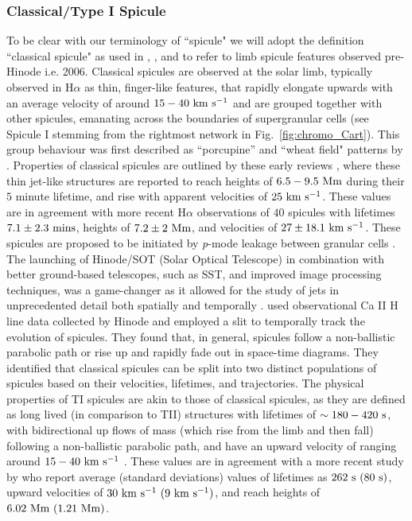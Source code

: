 \subsubsection{Classical/Type I Spicule}
\label{subsec:TI}
To be clear with our terminology of ``spicule" we will adopt the definition ``classical spicule" as used in \cite{Sterling2010ApJ7221644S}, \cite{Pereira2013ApJ76469P}, and \cite{Sterling2020ApJ893L45S} to refer to limb spicule features observed pre-Hinode i.e. 2006. Classical spicules are observed at the solar limb, typically observed in H$\alpha$ as thin, finger-like features, that rapidly elongate upwards with an average velocity of around $15-40~\rm{km ~s^{-1}}$ \citep{Pontieu2007PASJ} and are grouped together with other spicules, emanating across the boundaries of supergranular cells (see Spicule I stemming from the rightmost network in Fig.~\ref{fig:chromo_Cart}). This group behaviour was first described as ``porcupine” and ``wheat field" patterns by \cite{Lippincott1957SCoA215L}. Properties of classical spicules are outlined by these early reviews \cite{Beckers1968,Beckers1972ARA&A}, where these thin jet-like structures are reported to reach heights of $6.5-9.5~\rm{Mm}$ during their $5$ minute lifetime, and rise with apparent velocities of $25~\rm{km ~s^{-1}}$. These values are in agreement with more recent H$\alpha$ observations of $40$ spicules with lifetimes $7.1\pm2.3~\rm{mins}$, heights of $7.2\pm2~\rm{Mm}$, and velocities of $27\pm18.1~\rm{km ~s^{-1}}$. These spicules are proposed to be initiated by \textit{p}-mode leakage between granular cells \citep{Pontieu2004Natur}. \np
%
The launching of Hinode/SOT (Solar Optical Telescope) in combination with better ground-based telescopes, such as SST, and improved image processing techniques, was a game-changer as it allowed for the study of jets in unprecedented detail both spatially and temporally \citep{Aschwanden2010SoPh262235A}. \cite{Pontieu2007PASJ} used observational Ca II H line data collected by Hinode and employed a slit to temporally track the evolution of spicules. They found that, in general, spicules follow a non-ballistic parabolic path or rise up and rapidly fade out in space-time diagrams. They identified that classical spicules can be split into two distinct populations of spicules based on their velocities, lifetimes, and trajectories. The physical properties of TI spicules are akin to those of classical spicules, as they are defined as long lived (in comparison to TII) structures with lifetimes of $\sim 180-420~\rm{s}$, with bidirectional up flows of mass (which rise from the limb and then fall) following a non-ballistic parabolic path, and have an upward velocity of ranging around $15-40~\rm{km ~s^{-1}}$ \citep{Pontieu2007PASJ}. These values are in agreement with a more recent study by \cite{Pereira2012} who report average (standard deviations) values of lifetimes as $262~\rm{s}~(80~\rm{s})$, upward velocities of $30~\rm{km ~s^{-1}}~(9~\rm{km ~s^{-1}})$, and reach heights of $6.02~\rm{Mm}~(1.21~\rm{Mm})$. \np
